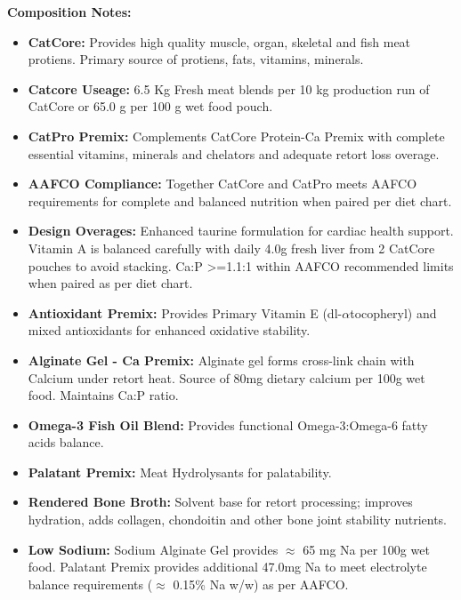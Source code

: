 \noindent\textbf{Composition Notes:}
\begin{itemize}
\item\textbf {CatCore: }Provides high quality muscle, organ, skeletal and fish meat protiens. Primary source of protiens, fats, vitamins, minerals. 
\item \textbf{Catcore Useage: }6.5 Kg Fresh meat blends per 10 kg production run of CatCore or 65.0 g per 100 g wet food pouch.
\item \textbf{CatPro Premix: } Complements CatCore Protein-Ca Premix with complete essential vitamins, minerals and chelators and adequate retort loss overage. 
\item\textbf{AAFCO Compliance: } Together CatCore and CatPro meets AAFCO requirements for complete and balanced nutrition when paired per diet chart. 
\item\textbf{Design Overages: }Enhanced taurine formulation for cardiac health support. Vitamin A is balanced carefully with daily 4.0g fresh liver from 2 CatCore pouches to avoid stacking. Ca:P >=1.1:1 within AAFCO recommended limits when paired as per diet chart. 
\item \textbf{Antioxidant Premix: } Provides Primary Vitamin E (dl-$\alpha$tocopheryl) and mixed antioxidants for enhanced oxidative stability.
\item \textbf{Alginate Gel - Ca Premix:} Alginate gel forms cross-link chain with Calcium under retort heat. Source of 80mg dietary calcium per 100g wet food. Maintains Ca:P ratio. 
\item \textbf{Omega-3 Fish Oil Blend:} Provides functional Omega-3:Omega-6 fatty acids balance. 
\item \textbf{Palatant Premix: } Meat Hydrolysants for palatability.
\item \textbf{Rendered Bone Broth: } Solvent base for retort processing; improves hydration, adds collagen, chondoitin and other bone joint stability nutrients. 
\item\textbf {Low Sodium:} Sodium Alginate Gel provides $\approx$ 65 mg Na per 100g wet food. Palatant Premix provides additional 47.0mg Na to meet electrolyte balance requirements ($\approx$ 0.15\% Na w/w) as per AAFCO. 
\end{itemize}

